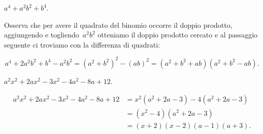 \begin{exrig}
 \begin{esempio}
 $a^4+a^{2}b^{2}+b^4$.

Osserva che per avere il quadrato del binomio occorre il doppio
prodotto, aggiungendo e togliendo~$a^{2}b^{2}$ otteniamo il doppio
prodotto cercato e al passaggio seguente ci troviamo con la differenza
di quadrati:

\[a^4+2a^2b^2+b^4 -a^2b^2=\left(a^2+b^2\right)^2-\left(ab\right)^2%
 =\left(a^2+b^2+ab\right)\left(a^2+b^2-ab\right).\]

 \end{esempio}
% 
% 

 \begin{esempio}
 $a^{2}x^{2}+2ax^{2}-3x^{2}-4a^{2}-8a+12$.

 \begin{align*}
  a^{2}x^{2}+2ax^{2}-3x^{2}-4a^{2}-8a+12&=
  x^{2}\left(a^{2}+2a-3\right)-4\left(a^{2}+2a-3\right)\\
  &=\left(x^{2}-4\right)\left(a^{2}+2a-3\right)\\
  &=(x+2)(x-2)(a-1)(a+3).\\
 \end{align*}
 \end{esempio}

\end{exrig}
